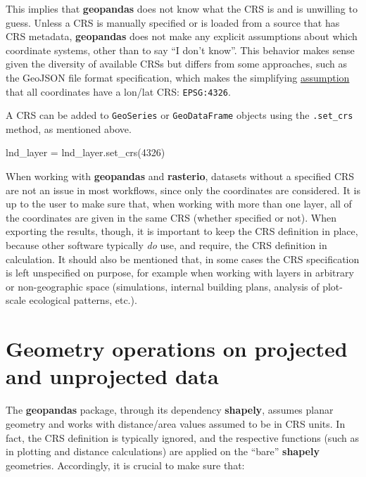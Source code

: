 \documentclass[
  letterpaper,
]{krantz}
\newenvironment{Shaded}{\begin{snugshade}}{\end{snugshade}}
\newcommand{\DecValTok}[1]{\textcolor[rgb]{0.68,0.00,0.00}{#1}}
\newcommand{\NormalTok}[1]{\textcolor[rgb]{0.00,0.23,0.31}{#1}}
\newcommand{\OperatorTok}[1]{\textcolor[rgb]{0.37,0.37,0.37}{#1}}
\begin{document}
This implies that \textbf{geopandas} does not know what the CRS is and
is unwilling to guess. Unless a CRS is manually specified or is loaded
from a source that has CRS metadata, \textbf{geopandas} does not make
any explicit assumptions about which coordinate systems, other than to
say ``I don't know''. This behavior makes sense given the diversity of
available CRSs but differs from some approaches, such as the GeoJSON
file format specification, which makes the simplifying
\href{https://datatracker.ietf.org/doc/html/rfc7946\#section-4}{assumption}
that all coordinates have a lon/lat CRS: \texttt{EPSG:4326}.

A CRS can be added to \texttt{GeoSeries} or \texttt{GeoDataFrame}
objects using the \texttt{.set\_crs} method, as mentioned above.

\begin{Shaded}
\begin{Highlighting}[]
\NormalTok{lnd\_layer }\OperatorTok{=}\NormalTok{ lnd\_layer.set\_crs(}\DecValTok{4326}\NormalTok{)}
\end{Highlighting}
\end{Shaded}

When working with \textbf{geopandas} and \textbf{rasterio}, datasets
without a specified CRS are not an issue in most workflows, since only
the coordinates are considered. It is up to the user to make sure that,
when working with more than one layer, all of the coordinates are given
in the same CRS (whether specified or not). When exporting the results,
though, it is important to keep the CRS definition in place, because
other software typically \emph{do} use, and require, the CRS definition
in calculation. It should also be mentioned that, in some cases the CRS
specification is left unspecified on purpose, for example when working
with layers in arbitrary or non-geographic space (simulations, internal
building plans, analysis of plot-scale ecological patterns, etc.).

\section{Geometry operations on projected and unprojected
data}\label{sec-geometry-operations-on-projected-and-unprojected-data}

The \textbf{geopandas} package, through its dependency \textbf{shapely},
assumes planar geometry and works with distance/area values assumed to
be in CRS units. In fact, the CRS definition is typically ignored, and
the respective functions (such as in plotting and distance calculations)
are applied on the ``bare'' \textbf{shapely} geometries. Accordingly, it
is crucial to make sure that:
\end{document}
